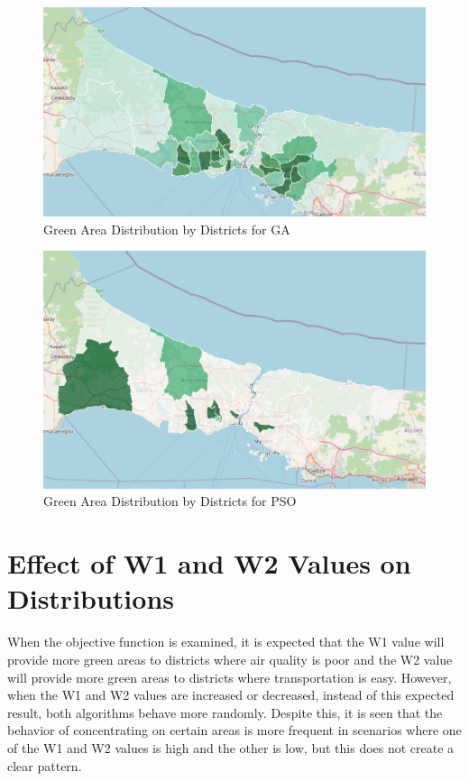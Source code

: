 \documentclass[conference]{IEEEtran}
\begin{document}
\begin{figure}[H]
    \centering
    \includegraphics[width=0.8\linewidth]{map_ga.png}
    \caption{Green Area Distribution by Districts for GA}
    \label{fig:map_ga}
\end{figure}

\begin{figure}[H]
    \centering
    \includegraphics[width=0.8\linewidth]{map_pso.png}
    \caption{Green Area Distribution by Districts for PSO}
    \label{fig:map_pso}
\end{figure}

\section{Effect of W1 and W2 Values on Distributions}
When the objective function is examined, it is expected that the W1 value will provide more green areas to districts where air quality is poor and the W2 value will provide more green areas to districts where transportation is easy. However, when the W1 and W2 values are increased or decreased, instead of this expected result, both algorithms behave more randomly.
Despite this, it is seen that the behavior of concentrating on certain areas is more frequent in scenarios where one of the W1 and W2 values is high and the other is low, but this does not create a clear pattern.\\
\end{document}
